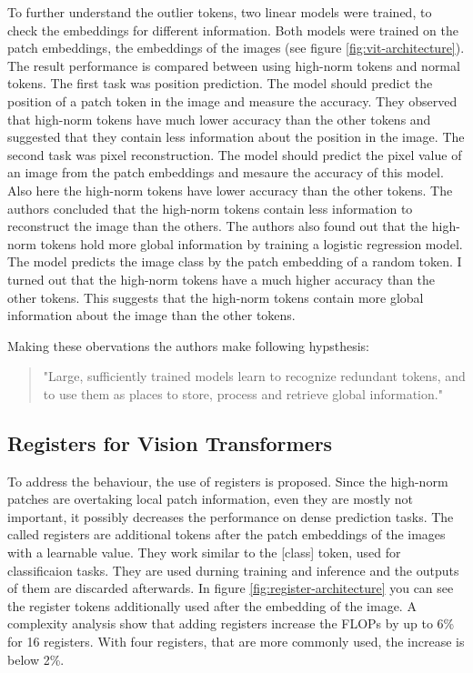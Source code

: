 \documentclass[conference]{IEEEtran}
\begin{document}
  To further understand the outlier tokens, two linear models were trained, to check the embeddings for different information. Both models were trained on the patch embeddings, the embeddings of the images (see figure \ref{fig:vit-architecture}). The result performance is compared between using high-norm tokens and normal tokens. The first task was position prediction. The model should predict the position of a patch token in the image and measure the accuracy. They observed that high-norm tokens have much lower accuracy than the other tokens and suggested that they contain less information about the position in the image. The second task was pixel reconstruction. The model should predict the pixel value of an image from the patch embeddings and mesaure the accuracy of this model. Also here the high-norm tokens have  lower accuracy than the other tokens. The authors concluded that the high-norm tokens contain less information to reconstruct the image than the others. 
  The authors also found out that the high-norm tokens hold more global information by training a logistic regression model. The model predicts the image class by the patch embedding of a random token. I turned out that the high-norm tokens have a much higher accuracy than the other tokens. This suggests that the high-norm tokens contain more global information about the image than the other tokens. 

  Making these obervations the authors make following hypsthesis:
  \begin{quote}
    "Large, sufficiently trained models learn to recognize redundant tokens, and to use them as places to store, process and retrieve global information." \cite{registers}
  \end{quote}

  \subsection{Registers for Vision Transformers}
  \label{sec:registers:registers}


  To address the behaviour, the use of registers is proposed. Since the high-norm patches are overtaking local patch information, even they are mostly not important, it possibly decreases the performance on dense prediction tasks. The called registers are additional tokens after the patch embeddings of the images with a learnable value. They work similar to the [class] token, used for classificaion tasks. They are used durning training and inference and the outputs of them are discarded afterwards. In figure \ref{fig:register-architecture} you can see the register tokens additionally used after the embedding of the image. A complexity analysis show that adding registers increase the FLOPs by up to 6\% for 16 registers. With four registers, that are more commonly used, the increase is below 2\%.
\end{document}
